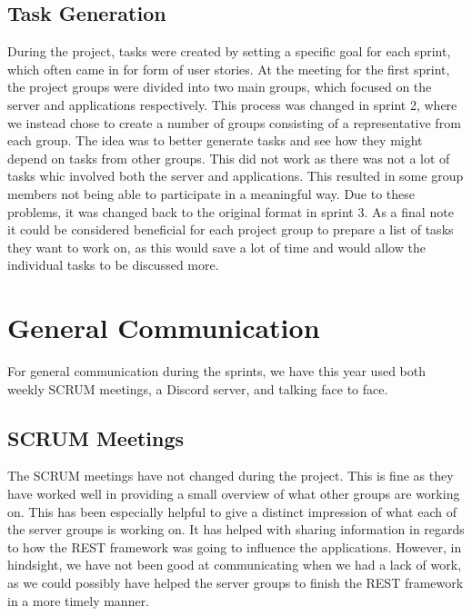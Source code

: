 \subsection{Task Generation}
During the project, tasks were created by setting a specific goal for each
sprint, which often came in for form of user stories. At the meeting for the
first sprint, the project groups were divided into two main groups, which
focused on the server and applications respectively. This process was changed in
sprint 2, where we instead chose to create a number of groups consisting of a
representative from each group. The idea was to better generate tasks and see
how they might depend on tasks from other groups. This did not work as there was
not a lot of tasks whic involved both the server and applications.
This resulted in some group members not being able to participate in a
meaningful way. Due to these problems, it was changed back to the original
format in sprint 3. As a final note it could be considered beneficial for each
project group to prepare a list of tasks they want to work on, as this would
save a lot of time and would allow the individual tasks to be discussed more.

\section{General Communication}
For general communication during the sprints, we have this year used both weekly
SCRUM meetings, a Discord server, and talking face to face.

\subsection{SCRUM Meetings}
The SCRUM meetings have not changed during the project. This is fine as they
have worked well in providing a small overview of what other groups are working
on. This has been especially helpful to give a distinct impression of what each
of the server groups is working on. It has helped with sharing information in
regards to how the REST framework was going to influence the applications.
However, in hindsight, we have not been good at communicating when we had a lack
of work, as we could possibly have helped the server groups to finish the REST
framework in a more timely manner.

